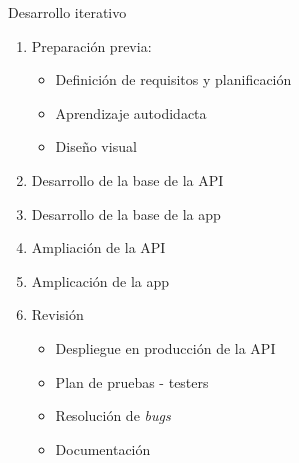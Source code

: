 \documentclass[10pt,xcolor=svgnames]{beamer}
\begin{document}
\begin{frame}{Desarrollo iterativo}

  \begin{enumerate}
  \item Preparación previa:
    \begin{itemize}
    \item Definición de requisitos y planificación
    \item Aprendizaje autodidacta
    \item Diseño visual
    \end{itemize}
  \item Desarrollo de la base de la API
  \item Desarrollo de la base de la app
  \item Ampliación de la API
  \item Amplicación de la app
  \item Revisión
    \begin{itemize}
    \item Despliegue en producción de la API
    \item Plan de pruebas - testers
    \item Resolución de \textit{bugs}
    \item Documentación
    \end{itemize}
  \end{enumerate}
  
\end{frame}
  
\end{document}
